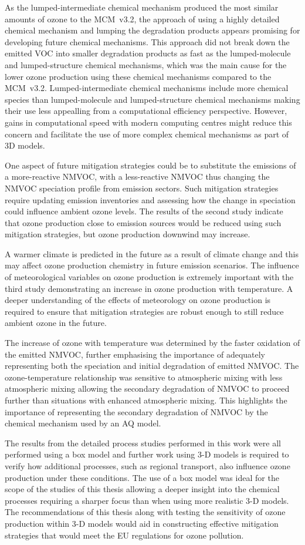 As the lumped-intermediate chemical mechanism produced the most similar amounts of ozone to the MCM~v3.2, the approach of using a highly detailed chemical mechanism and lumping the degradation products appears promising for developing future chemical mechanisms.
This approach did not break down the emitted VOC into smaller degradation products as fast as the lumped-molecule and lumped-structure chemical mechanisms, which was the main cause for the lower ozone production using these chemical mechanisms compared to the MCM~v3.2.
Lumped-intermediate chemical mechanisms include more chemical species than lumped-molecule and lumped-structure chemical mechanisms making their use less appealling from a computational efficiency perspective.
However, gains in computational speed with modern computing centres might reduce this concern and facilitate the use of more complex chemical mechanisms as part of 3D models.

One aspect of future mitigation strategies could be to substitute the emissions of a more-reactive NMVOC, with a less-reactive NMVOC thus changing the NMVOC speciation profile from emission sectors.
Such mitigation strategies require updating emission inventories and assessing how the change in speciation could influence ambient ozone levels.
The results of the second study indicate that ozone production close to emission sources would be reduced using such mitigation strategies, but ozone production downwind may increase.

A warmer climate is predicted in the future as a result of climate change and this may affect ozone production chemistry in future emission scenarios.
The influence of meteorological variables on ozone production is extremely important with the third study demonstrating an increase in ozone production with temperature.
A deeper understanding of the effects of meteorology on ozone production is required to ensure that mitigation strategies are robust enough to still reduce ambient ozone in the future.

The increase of ozone with temperature was determined by the faster oxidation of the emitted NMVOC, further emphasising the importance of adequately representing both the speciation and initial degradation of emitted NMVOC.
The ozone-temperature relationship was sensitive to atmospheric mixing with less atmospheric mixing allowing the secondary degradation of NMVOC to proceed further than situations with enhanced atmospheric mixing.
This highlights the importance of representing the secondary degradation of NMVOC by the chemical mechanism used by an AQ model.

The results from the detailed process studies performed in this work were all performed using a box model and further work using 3-D models is required to verify how additional processes, such as regional transport, also influence ozone production under these conditions.
The use of a box model was ideal for the scope of the studies of this thesis allowing a deeper insight into the chemical processes requiring a sharper focus than when using more realistic 3-D models.
The recommendations of this thesis along with testing the sensitivity of ozone production within 3-D models would aid in constructing effective mitigation strategies that would meet the EU regulations for ozone pollution.
